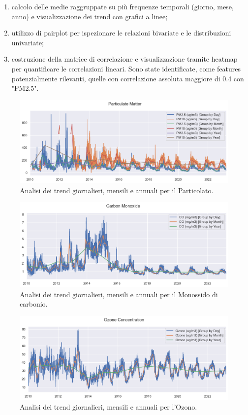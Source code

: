 \documentclass[a4paper,12pt]{report}
\begin{document}
	\begin{enumerate}
		\item calcolo delle medie raggruppate su più frequenze temporali (giorno, mese, anno) e visualizzazione dei trend con grafici a linee;
		\item utilizzo di pairplot per ispezionare le relazioni bivariate e le distribuzioni univariate;
		\item costruzione della matrice di correlazione e visualizzazione tramite heatmap per quantificare le correlazioni lineari. Sono state identificate, come features potenzialmente rilevanti, quelle con correlazione assoluta maggiore di 0.4 con "PM2.5".
	\end{enumerate}
	
	\begin{figure}[H]
		\centering
		\includegraphics[width=1.0\textwidth]{img/pm_trend_pm.png}
		\caption{Analisi dei trend giornalieri, mensili e annuali per il Particolato.}
	\end{figure}
	\begin{figure}[H]
		\centering
		\includegraphics[width=1.0\textwidth]{img/carbon_trend_pm.png}
		\caption{Analisi dei trend giornalieri, mensili e annuali per il Monossido di carbonio.}
	\end{figure}
	\begin{figure}[H]
		\centering
		\includegraphics[width=1.0\textwidth]{img/ozone_trend_pm.png}
		\caption{Analisi dei trend giornalieri, mensili e annuali per l'Ozono.}
	\end{figure}
\end{document}
